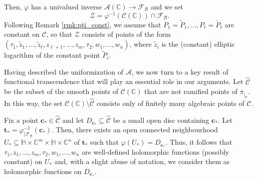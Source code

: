 \documentclass[11pt,a4paper,reqno]{amsart}
\numberwithin{equation}{section}
\newcommand{\C}{\mathbb{C}}
\renewcommand{\c}{\mathcal{C}}
\newcommand{\cc}{\mathbf{c}}
\newcommand{\f}{\varphi}
\newcommand{\pt}[1]{\left( #1 \right)}
\theoremstyle{remark}
\theoremstyle{definition}
\theoremstyle{definition}
\begin{document}
Then, $\f$ has a univalued inverse $\mathcal{A}(\C) \rightarrow \mathcal{F}_{\mathcal{B}}$ and we set
\begin{equation}\label{def:Z_isog}
\mathcal{Z}=\f^{-1}(\c(\C)) \cap \mathcal{F}_{\mathcal{B}}.
\end{equation}
Following Remark \ref{rmk:pti_const}, we assume that $P_1=\widetilde{P}_1, \ldots, P_{\ell}=\widetilde{P}_{\ell}$ are constant on $\c$, so that $\mathcal{Z}$ consists of points of the form $\pt{\tau_1,\widetilde{z}_1,\ldots,\widetilde{z}_{\ell}, z_{\ell+1}, \ldots, z_m, \tau_2, w_1, \ldots, w_n}$, where $\widetilde{z}_i$ is the (constant) elliptic logarithm of the constant point $\widetilde{P}_i$.

Having described the uniformization of $\mathcal{A}$, we now turn to a key result of functional transcendence that will play an essential role in our arguments. 
Let $\widehat{\c}$ be the subset of the smooth points of $\c(\C)$ that are not ramified points of $\pi_{\vert_{\c}}$. In this way, the set $\c(\C) \setminus \widehat{\c}$ consists only of finitely many algebraic points of $\c$.

Fix a point $\cc_{*} \in \widehat{\c}$ and let $D_{\cc_{*}}\subseteq \widehat{\c}$ be a small open disc containing $\cc_{*}$. Let $\mathbf{t}_{*}=\f_{\vert\mathcal{F}_{\mathcal{B}}}^{-1}(\cc_{*})$. Then, there exists an open connected neighbourhood $U_{*} \subseteq \mathbb{H}\times \C^m\times \mathbb{H} \times \C^n$ of $\mathbf{t}_{*}$ such that $\f(U_{*})=D_{\cc_{*}}$.
Thus, it follows that $\tau_1, z_1, \ldots, z_m, \tau_2, w_1, \ldots, w_n$ are well-defined holomorphic functions (possibly constant) on $U_{*}$ and, with a slight abuse of notation, we consider them as holomorphic functions on $D_{\cc_{*}}$.
\end{document}
